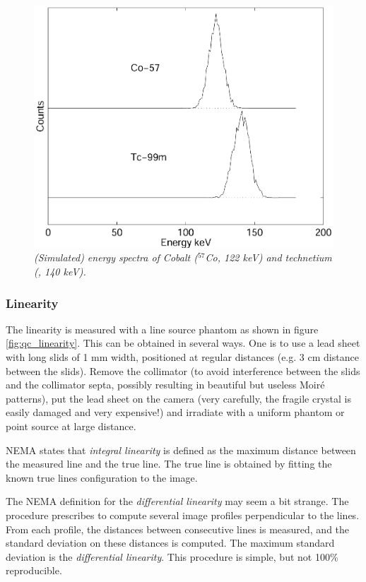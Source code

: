 \begin{figure}[tb]
\centering
\includegraphics[width=\figone]{figs/fig_qc_enresol.pdf}
\caption{\label{fig:qc_enresol} \emph{(Simulated) energy spectra of Cobalt
($^{57}$Co, 122 keV) and technetium (\Tc, 140 keV).}}
\end{figure}

\subsubsection{Linearity}
The linearity is measured with a line source phantom as shown in
figure \ref{fig:qc_linearity}. This can be obtained in several
ways. One is to use a lead sheet with long slids of 1 mm width,
positioned at regular distances (e.g. 3 cm distance between the
slids). Remove the collimator (to avoid interference between the slids
and the collimator septa, possibly resulting in beautiful but useless
Moir\'{e} patterns), put the lead sheet on the camera (very carefully,
the fragile crystal is easily damaged and very expensive!) and
irradiate with a uniform phantom or point source at large distance.

NEMA states that {\em integral linearity} is defined as the maximum distance
between the measured line and the true line. The true line is obtained by
fitting the known true lines configuration to the image.

The NEMA definition for the {\em differential linearity} may seem a bit
strange. The procedure prescribes to compute several image profiles
perpendicular to the lines. From each profile, the distances between
consecutive lines is measured, and the standard deviation on these distances is
computed. The maximum standard deviation is the {\em differential linearity}.
This procedure is simple, but not 100\% reproducible.

